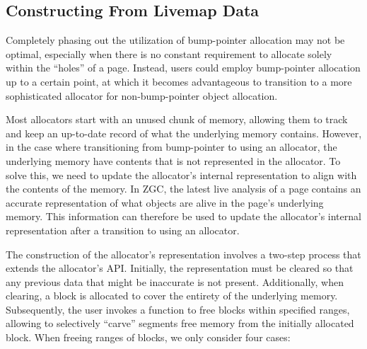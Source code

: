 

\subsection{Constructing From Livemap Data}

Completely phasing out the utilization of bump-pointer allocation may not be optimal, especially when there is no constant requirement to allocate solely within the ``holes'' of a page. Instead, users could employ bump-pointer allocation up to a certain point, at which it becomes advantageous to transition to a more sophisticated allocator for non-bump-pointer object allocation.

Most allocators start with an unused chunk of memory, allowing them to track and keep an up-to-date record of what the underlying memory contains. However, in the case where transitioning from bump-pointer to using an allocator, the underlying memory have contents that is not represented in the allocator. To solve this, we need to update the allocator's internal representation to align with the contents of the memory. In ZGC, the latest live analysis of a page contains an accurate representation of what objects are alive in the page's underlying memory. This information can therefore be used to update the allocator's internal representation after a transition to using an allocator.

The construction of the allocator's representation involves a two-step process that extends the allocator's API. Initially, the representation must be cleared so that any previous data that might be inaccurate is not present. Additionally, when clearing, a block is allocated to cover the entirety of the underlying memory. Subsequently, the user invokes a function to free blocks within specified ranges, allowing to selectively ``carve'' segments free memory from the initially allocated block. When freeing ranges of blocks, we only consider four cases: 

